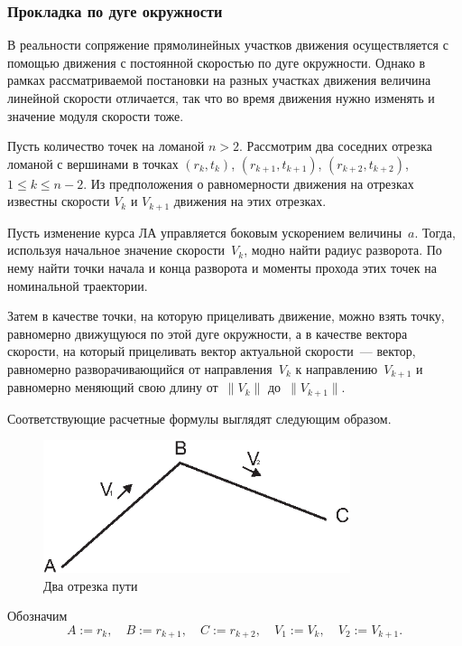 \documentclass[a4paper,12pt]{article}
\begin{document}
\subsubsection{Прокладка по дуге окружности}

В реальности сопряжение прямолинейных участков движения осуществляется с помощью движения с постоянной скоростью по дуге окружности. Однако в рамках рассматриваемой постановки на разных участках движения величина линейной скорости отличается, так что во время движения нужно изменять и значение модуля скорости тоже.

Пусть количество точек на ломаной $n>2$. Рассмотрим два соседних отрезка ломаной с вершинами в точках $(r_k,t_k)$, $(r_{k+1},t_{k+1})$, $(r_{k+2},t_{k+2})$, $1 \leqslant k \leqslant n-2$. Из предположения о равномерности движения на отрезках известны скорости $V_k$ и $V_{k+1}$ движения на этих отрезках.

Пусть изменение курса ЛА управляется боковым ускорением величины~$a$. Тогда, используя начальное значение скорости~$V_k$, модно найти радиус разворота. По нему найти точки начала и конца разворота и моменты прохода этих точек на номинальной траектории.

Затем в качестве точки, на которую прицеливать движение, можно взять точку, равномерно движущуюся по этой дуге окружности, а в качестве вектора скорости, на который прицеливать вектор актуальной скорости~--- вектор, равномерно разворачивающийся от направления~$V_k$ к направлению~$V_{k+1}$ и равномерно меняющий свою длину от~$\|V_k\|$ до~$\|V_{k+1}\|$.

Соответствующие расчетные формулы выглядят следующим образом.

\begin{figure}[h]
  \centering
  \includegraphics[width=90mm]{3point.eps}
  \caption{Два отрезка пути}\label{two_lines}
\end{figure}
  
Обозначим
\begin{equation*}
    A:=r_k, \quad B:=r_{k+1}, \quad C:=r_{k+2}, \quad
      V_1 := V_k, \quad V_2:= V_{k+1}.
\end{equation*}
\end{document}
